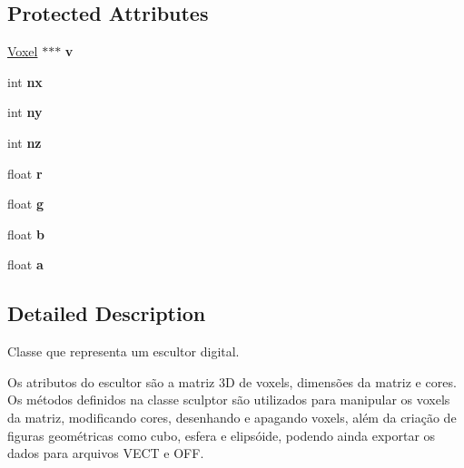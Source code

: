 \subsection*{Protected Attributes}
\begin{DoxyCompactItemize}
\item 
\mbox{\label{classSculptor_a4ca53a2f2fbf41ca42dfe729ebe693f1}} 
\mbox{\hyperlink{structVoxel}{Voxel}} $\ast$$\ast$$\ast$ {\bfseries v}
\item 
\mbox{\label{classSculptor_ad1e32f9042538419a3bc7b376f7813b8}} 
int {\bfseries nx}
\item 
\mbox{\label{classSculptor_a1ce2ff97ec94927928ab3f5ec4ba6761}} 
int {\bfseries ny}
\item 
\mbox{\label{classSculptor_a33204e7df26a7ee4c7192381a24335d3}} 
int {\bfseries nz}
\item 
\mbox{\label{classSculptor_a3f5d2ec3b66d645019b8d81c810a1cd8}} 
float {\bfseries r}
\item 
\mbox{\label{classSculptor_a208c06af69a81a1568df4493868816f1}} 
float {\bfseries g}
\item 
\mbox{\label{classSculptor_a7aafd7305ea634252d8288b60536cd96}} 
float {\bfseries b}
\item 
\mbox{\label{classSculptor_a6fd0157dcf17582f0edd5fddf157604e}} 
float {\bfseries a}
\end{DoxyCompactItemize}


\subsection{Detailed Description}
Classe que representa um escultor digital. 

Os atributos do escultor são a matriz 3D de voxels, dimensões da matriz e cores. Os métodos definidos na classe sculptor são utilizados para manipular os voxels da matriz, modificando cores, desenhando e apagando voxels, além da criação de figuras geométricas como cubo, esfera e elipsóide, podendo ainda exportar os dados para arquivos V\+E\+CT e O\+FF. 

